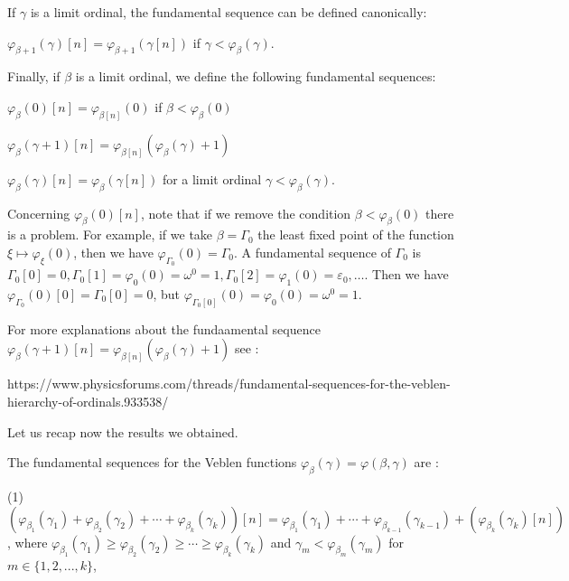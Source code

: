 \documentclass[10pt]{article}
\begin{document}
If \( \gamma \) is a limit ordinal, the fundamental sequence can be defined canonically:

\( \varphi_{\beta+1}(\gamma)[n] = \varphi_{\beta+1}(\gamma[n]) \) if \( \gamma < \varphi_\beta(\gamma) \).

Finally, if \( \beta \) is a limit ordinal, we define the following fundamental sequences:

\( \varphi_\beta(0)[n] =  \varphi_{\beta[n]}(0) \) if \( \beta < \varphi_\beta(0) \)

\( \varphi_\beta(\gamma+1)[n] = \varphi_{\beta[n]}(\varphi_\beta(\gamma)+1) \)

\( \varphi_\beta(\gamma)[n] = \varphi_\beta(\gamma[n]) \) for a limit ordinal \( \gamma < \varphi_\beta(\gamma) \).

\bigskip

Concerning \( \varphi_\beta(0)[n] \), note that if we remove the condition \( \beta < \varphi_\beta(0) \) there is a problem. For example, if we take \( \beta = \Gamma_0 \) the least fixed point of the function \( \xi \mapsto \varphi_\xi(0) \), then we have \( \varphi_{\Gamma_0}(0) = \Gamma_0 \).
A fundamental sequence of \( \Gamma_0 \) is \( \Gamma_0[0] = 0, \Gamma_0[1] = \varphi_0(0) = \omega^0 = 1, \Gamma_0[2] = \varphi_1(0) = \varepsilon_0, \ldots \).
 Then we have \( \varphi_{\Gamma_0}(0)[0] = \Gamma_0[0] = 0 \), but \( \varphi_{\Gamma_0[0]}(0) = \varphi_0(0) = \omega^0 = 1 \).

For more explanations about the fundaamental sequence 
\( \varphi_\beta(\gamma+1)[n] = \varphi_{\beta[n]}(\varphi_\beta(\gamma)+1) \) 
see :

https://www.physicsforums.com/threads/fundamental-sequences-for-the-veblen-hierarchy-of-ordinals.933538/

\bigskip

Let us recap now the results we obtained.

The fundamental sequences for the Veblen functions \(\varphi_\beta(\gamma) = \varphi(\beta,\gamma) \) are :

\bigskip

(1) \((\varphi_{\beta_1}(\gamma_1) + \varphi_{\beta_2}(\gamma_2) + \cdots + \varphi_{\beta_k}(\gamma_k))[n]=\varphi_{\beta_1}(\gamma_1) + \cdots + \varphi_{\beta_{k-1}}(\gamma_{k-1}) + (\varphi_{\beta_k}(\gamma_k) [n])\), where \(\varphi_{\beta_1}(\gamma_1) \ge \varphi_{\beta_2}(\gamma_2) \ge \cdots \ge \varphi_{\beta_k}(\gamma_k)\) and \(\gamma_m < \varphi_{\beta_m}(\gamma_m)\) for \(m \in \{1,2,...,k\}\),
\end{document}
